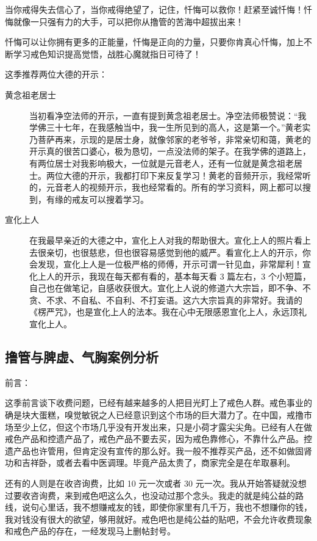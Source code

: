 \documentclass{ctexart}
\begin{document}
当你戒得失去信心了，当你戒得绝望了，记住，忏悔可以救你！赶紧至诚忏悔！忏悔就像一只强有力的大手，可以把你从撸管的苦海中超拔出来！

忏悔可以让你拥有更多的正能量，忏悔是正向的力量，只要你肯真心忏悔，加上不断学习戒色知识提高觉悟，战胜心魔就指日可待了！

这季推荐两位大德的开示：

\begin{description}
    \item[黄念祖老居士] 当初看净空法师的开示，一直有提到黄念祖老居士。净空法师极赞说：“我学佛三十七年，在我感触当中，我一生所见到的高人，这是第一个。”黄老实乃菩萨再来，示现的是居士身，就像邻家的老爷爷，非常亲切和蔼，黄老的开示真的很苦口婆心，极为恳切，一点没法师的架子。在我学佛的道路上，有两位居士对我影响极大，一位就是元音老人，还有一位就是黄念祖老居士。两位大德的开示，我都打印下来反复学习！黄老的音频开示，我经常听的，元音老人的视频开示，我也经常看的。所有的学习资料，网上都可以搜到，有缘的戒友可以搜着学习。
    \item[宣化上人] 在我最早亲近的大德之中，宣化上人对我的帮助很大。宣化上人的照片看上去很亲切，也很慈悲，但也很容易感觉到他的威严。看宣化上人的开示，你会发现，宣化上人是一位极严格的师傅，开示可谓一针见血，非常犀利！宣化上人的开示，我现在每天都有看的，基本每天看 3 篇左右，3 个小短篇，自己也在做笔记，自感收获很大。宣化上人说的修道六大宗旨，即不争、不贪、不求、不自私、不自利、不打妄语。这六大宗旨真的非常好。我请的《楞严咒》，也是宣化上人的法本。我在心中无限感恩宣化上人，永远顶礼宣化上人。
\end{description}

\subsection{撸管与脾虚、气胸案例分析}

前言：

这季前言谈下收费问题，已经有越来越多的人把目光盯上了戒色人群。戒色事业的确是块大蛋糕，嗅觉敏锐之人已经意识到这个市场的巨大潜力了。在中国，戒撸市场至少上亿，但这个市场几乎没有开发出来，只是小荷才露尖尖角。已经有人在做戒色产品和控遗产品了，戒色产品不要去买，因为戒色靠修心，不靠什么产品。控遗产品也许管用，但肯定没有宣传的那么好。我一般不推荐买产品，还不如做固肾功和吉祥卧，或者去看中医调理。毕竟产品太贵了，商家完全是在牟取暴利。

还有的人则是在收咨询费，比如 10 元一次或者 30 元一次。我从开始答疑就没想过要收咨询费，来到戒色吧这么久，也没动过那个念头。我走的就是纯公益的路线，说句心里话，我不想赚戒友的钱，即使你家里有几千万，我也不想赚你的钱，我对钱没有很大的欲望，够用就好。戒色吧也是纯公益的贴吧，不会允许收费现象和戒色产品的存在，一经发现马上删帖封号。
\end{document}
